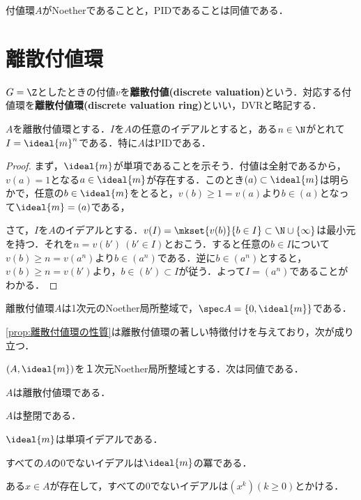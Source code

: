 \begin{cor}
	付値環$A$がNoetherであることと，PIDであることは同値である．
\end{cor}

\section{離散付値環}
\begin{defi}[離散付値]
	$G=\Z$としたときの付値$v$を\textbf{離散付値(discrete valuation)}という．対応する付値環を\textbf{離散付値環(discrete valuation ring)}といい，DVRと略記する．
\end{defi}

\begin{prop}\label{prop:離散付値環の性質}
	$A$を離散付値環とする．$I$を$A$の任意のイデアルとすると，ある$n\in\N$がとれて$I=\ideal{m}^n$である．特に$A$はPIDである．
\end{prop}

\begin{proof}
	まず，$\ideal{m}$が単項であることを示そう．付値は全射であるから，$v(a)=1$となる$a\in\ideal{m}$が存在する．このとき$(a)\subset\ideal{m}$は明らかで，任意の$b\in\ideal{m}$をとると，$v(b)\geq1=v(a)$より$b\in (a)$となって$\ideal{m}=(a)$である，
	
	さて，$I$を$A$のイデアルとする．$v(I)=\mkset{v(b)}{b\in I}\subset\N\cup\{\infty\}$は最小元を持つ．それを$n=v(b')~(b'\in I)$とおこう．すると任意の$b\in I$について$v(b)\geq n=v(a^n)$より$b\in (a^n)$である．逆に$b\in(a^n)$とすると，$v(b)\geq n=v(b')$より，$b\in(b')\subset I$が従う．よって$I=(a^n)$であることがわかる．
\end{proof}

\begin{cor}
	離散付値環$A$は1次元のNoether局所整域で，$\spec A=\{0,\ideal{m}\}$である．
\end{cor}

\ref{prop:離散付値環の性質}は離散付値環の著しい特徴付けを与えており，次が成り立つ．

\begin{thm}\label{thm:DVRの特徴づけ}
	$(A,\ideal{m})$を１次元Noether局所整域とする．次は同値である．
	\begin{sakura}
		\item $A$は離散付値環である．
		\item $A$は整閉である．
		\item $\ideal{m}$は単項イデアルである．
		\item すべての$A$の0でないイデアルは$\ideal{m}$の冪である．
		\item ある$x\in A$が存在して，すべての0でないイデアルは$(x^k) (k\geq0)$とかける．
	\end{sakura}
\end{thm}

